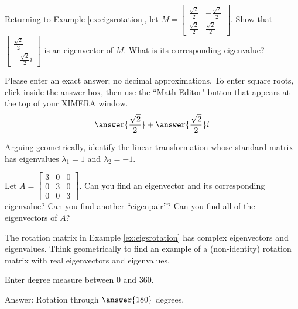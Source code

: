 \documentclass{ximera}
\begin{document}
 
\begin{problem}\label{ex:eigsrotation2}
Returning to Example \ref{ex:eigsrotation}, let $M=\begin{bmatrix}
\frac{\sqrt{2}}{2} & -\frac{\sqrt{2}}{2}\\
\frac{\sqrt{2}}{2} & \frac{\sqrt{2}}{2}
\end{bmatrix}$.  Show that $\begin{bmatrix} \frac{\sqrt{2}}{2}\\ -\frac{\sqrt{2}}{2} i \end{bmatrix}$ is an eigenvector of $M$.  What is its corresponding eigenvalue?

Please enter an exact answer; no decimal approximations.  To enter square roots, click inside the answer box, then use the ``Math Editor" button that appears at the top of your XIMERA window.
$$\answer{\frac{\sqrt{2}}{2}}+\answer{\frac{\sqrt{2}}{2}}i$$
\end{problem}


\begin{problem}\label{prob:eigenvalgeometry}
Arguing geometrically, identify the linear transformation whose standard matrix has eigenvalues $\lambda_1=1$ and $\lambda_2=-1$.
\begin{multipleChoice}
  \end{multipleChoice}
\end{problem}

\begin{problem}\label{prob:eigvalvectorsofdiagmat} Let $A=\begin{bmatrix} 3&0&0\\0&3&0\\0&0&3\end{bmatrix}$.  Can you find an eigenvector and its corresponding eigenvalue?  Can you find another ``eigenpair''?  Can you find all of the eigenvectors of $A$?
\end{problem}

\begin{problem}\label{prob:rotmatrixrealeig1}The rotation matrix in Example \ref{ex:eigsrotation} has complex eigenvectors and eigenvalues.  Think geometrically to find an example of a (non-identity) rotation matrix with real eigenvectors and eigenvalues.  

Enter degree measure between 0 and 360.

Answer:  Rotation through $\answer{180}$ degrees.
\end{problem}
\end{document}

